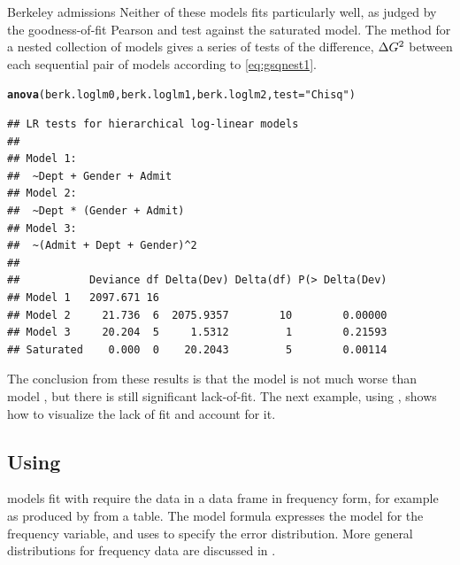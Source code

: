 \documentclass[11pt]{book}\usepackage[]{graphicx}\usepackage[]{color}
\makeatletter
\newcommand{\hlstr}[1]{\textcolor[rgb]{0.192,0.494,0.8}{#1}}%
\newcommand{\hlstd}[1]{\textcolor[rgb]{0.345,0.345,0.345}{#1}}%
\newcommand{\hlkwc}[1]{\textcolor[rgb]{0.333,0.667,0.333}{#1}}%
\newcommand{\hlkwd}[1]{\textcolor[rgb]{0.737,0.353,0.396}{\textbf{#1}}}%
\newenvironment{kframe}{%
 \def\at@end@of@kframe{}%
 \ifinner\ifhmode%
  \def\at@end@of@kframe{\end{minipage}}%
  \begin{minipage}{\columnwidth}%
 \fi\fi%
 \def\FrameCommand##1{\hskip\@totalleftmargin \hskip-\fboxsep
 \colorbox{shadecolor}{##1}\hskip-\fboxsep
     \hskip-\linewidth \hskip-\@totalleftmargin \hskip\columnwidth}%
 \MakeFramed {\advance\hsize-\width
   \@totalleftmargin\z@ \linewidth\hsize
   \@setminipage}}%
 {\par\unskip\endMakeFramed%
 \at@end@of@kframe}
\newenvironment{knitrout}{}{} %
\renewenvironment{knitrout}{\small\renewcommand{\baselinestretch}{.85}}{} %
\makeatother
\begin{document}
\begin{Example}[berkeley5]{Berkeley admissions}
Neither of these models fits particularly well, as judged by the goodness-of-fit
Pearson \chisq and \LR \GSQ test against the saturated model.
The  method for a nested collection of  models
gives a series of \LR tests of the difference, $\Delta G^2$
between each sequential pair of models according to \eqref{eq:gsqnest1}.

\begin{knitrout}
\color{fgcolor}\begin{kframe}
\begin{alltt}
\hlkwd{anova}\hlstd{(berk.loglm0, berk.loglm1, berk.loglm2,} \hlkwc{test}\hlstd{=}\hlstr{"Chisq"}\hlstd{)}
\end{alltt}
\begin{verbatim}
## LR tests for hierarchical log-linear models
## 
## Model 1:
##  ~Dept + Gender + Admit 
## Model 2:
##  ~Dept * (Gender + Admit) 
## Model 3:
##  ~(Admit + Dept + Gender)^2 
## 
##           Deviance df Delta(Dev) Delta(df) P(> Delta(Dev)
## Model 1   2097.671 16                                    
## Model 2     21.736  6  2075.9357        10        0.00000
## Model 3     20.204  5     1.5312         1        0.21593
## Saturated    0.000  0    20.2043         5        0.00114
\end{verbatim}
\end{kframe}
\end{knitrout}
The conclusion from these results is that
the model 
is not much worse than model , but there is still significant
lack-of-fit.  The next example, using , shows how to visualize the
lack of fit and account for it.

\end{Example}

\subsection[Using glm()]{Using }\label{sec:loglin-glm}
\Loglin models fit with  require the data in a data frame
in frequency form, for example as produced by  from
a table.
The model formula expresses the model for the frequency variable, and
uses  to specify the error distribution.
More general distributions for frequency data are discussed in
.
\end{document}
